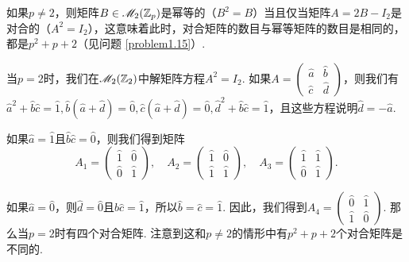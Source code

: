 \begin{solution}
  如果$p\ne2$，则矩阵$B\in\mathscr M_2(\mathbb Z_p)$是幂等的（$B^2=B$）当且仅当矩阵$A=2B-I_2$是对合的（$A^2=I_2$），这意味着此时，对合矩阵的数目与幂等矩阵的数目是相同的，都是$p^2+p+2$（见问题 \ref{problem1.15}）.

  当$p=2$时，我们在$\mathscr M_2(\mathbb Z_2)$中解矩阵方程$A^2=I_2$. 如果$A=\begin{pmatrix}
    \hat a & \hat b \\
    \hat c & \hat d
  \end{pmatrix}$，则我们有$\hat a^2+\hat b\hat c=\hat 1,\hat b\left(\hat a+\hat d\right)=\hat0,\hat c(\hat a+\hat d)=\hat 0,\hat d^2+\hat b\hat c=\hat1$，且这些方程说明$\hat d=-\hat a$.

  如果$\hat a=\hat 1$且$\hat b\hat c=\hat0$，则我们得到矩阵
  \[
    A_1 = \begin{pmatrix}
      \hat 1 & \hat 0 \\
      \hat 0 & \hat 1
    \end{pmatrix},\quad A_2 = \begin{pmatrix}
      \hat 1 & \hat 0 \\
      \hat 1 & \hat 1
    \end{pmatrix},\quad
    A_3 = \begin{pmatrix}
      \hat 1 & \hat 1 \\
      \hat 0 & \hat 1
    \end{pmatrix}.
  \]

  如果$\hat a=\hat0$，则$\hat d=\hat0$且$\hat b\hat c=\hat1$，所以$\hat b=\hat c=\hat 1$. 因此，我们得到$A_4=\begin{pmatrix}
    \hat 0 & \hat 1 \\
    \hat 1 & \hat 0
  \end{pmatrix}$. 那么当$p=2$时有四个对合矩阵. 注意到这和$p\ne2$的情形中有$p^2+p+2$个对合矩阵是不同的.
\end{solution}

